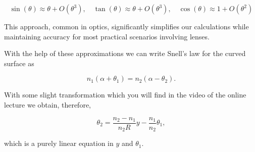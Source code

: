 \documentclass[
  a4paper,
]{book}
\begin{document}
\[\sin(\theta) \approx \theta+ O(\theta^{3}), \quad \tan(\theta) \approx \theta + O(\theta^{3}),\quad \cos(\theta)\approx 1 + O(\theta^{2})\]

This approach, common in optics, significantly simplifies our
calculations while maintaining accuracy for most practical scenarios
involving lenses.

With the help of these approximations we can write Snell's law for the
curved surface as

\[n_1(\alpha+\theta_1)=n_2(\alpha-\theta_2).\]

With some slight transformation which you will find in the video of the
online lecture we obtain, therefore,

\[\theta_2=\frac{n_2-n_1}{n_2 R}y -\frac{n_1}{n_2}\theta_1,\]

which is a purely linear equation in \(y\) and \(\theta_1\).
\end{document}

